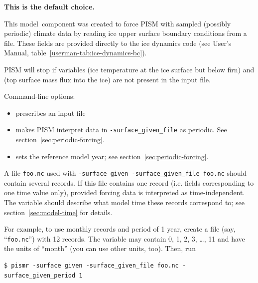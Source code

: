 \documentclass[titlepage,letterpaper,final]{scrartcl}
\begin{document}
\begin{center}
  \bf This is the default choice.
\end{center}

This model~component was created to force PISM with sampled (possibly periodic)
climate data by reading ice upper surface boundary conditions from a file.
These fields are provided directly to the ice dynamics code (see User's
Manual, table~\ref*{userman-tab:ice-dynamics-bc}).

PISM will stop if variables  (ice temperature at the
ice surface but below firn) and  (top surface
mass flux into the ice) are not present in the input file.

Command-line options:
\begin{itemize}
\item {} prescribes an input file
\item {} makes PISM interpret data in
\texttt{-surface_given_file} as periodic. See section~\ref{sec:periodic-forcing}.
\item {} sets the reference model year;
  see section~\ref{sec:periodic-forcing}.
\end{itemize}

A file \texttt{foo.nc} used with \texttt{-surface given -surface_given_file
  foo.nc} should contain several records. If this file contains one record
(i.e. fields corresponding to one time value only), provided forcing data is
interpreted as time-independent. The  variable should describe
what model time these records correspond to; see section~\ref{sec:model-time}
for details.

For example, to use monthly records and period of 1 year, create a file (say,
``\texttt{foo.nc}'') with 12 records. The  variable may contain
0, 1, 2, 3, \dots, 11 and have the units of ``month'' (you can use other units,
too). Then, run
\begin{verbatim}
$ pismr -surface given -surface_given_file foo.nc -surface_given_period 1
\end{verbatim}%
\end{document}
